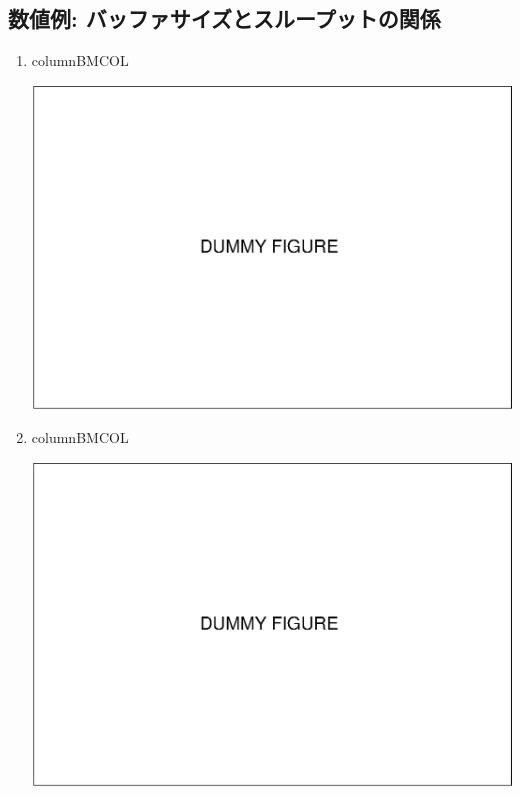 \documentclass[compress,dvipdfmx,11pt]{beamer}
\begin{document}
\subsection{数値例: バッファサイズとスループットの関係}
\label{sec:orgee77a50}

\begin{enumerate}
\item column\hfill{}\textsc{BMCOL}
\label{sec:org88d3156}
\begin{center}
\begin{center}
\includegraphics[width=\columnwidth,height=.7\textheight]{./figure/dummy.eps}
\end{center}
\end{center}

\item column\hfill{}\textsc{BMCOL}
\label{sec:org0511b46}
\begin{center}
\begin{center}
\includegraphics[width=\columnwidth,height=.7\textheight]{./figure/dummy.eps}
\end{center}
\end{center}
\end{enumerate}
\end{document}
